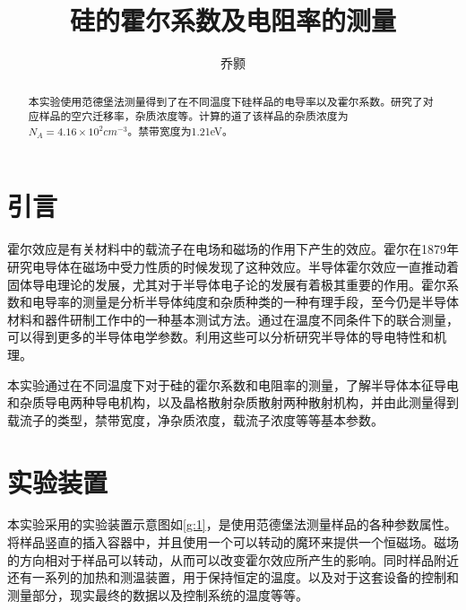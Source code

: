 \documentclass[aps,pre,12pt,preprint,onecolumn,showpacs,showkeys,UTF8]{revtex4-1}
\begin{document}
\title{\bf\heiti{}硅的霍尔系数及电阻率的测量\vspace{15mm}}
\author{\fangsong 乔颢\vspace{2mm}}
\begin{abstract}
	\vspace{10mm}
	\begin{spacing}{1.5}
		\songti{}本实验使用范德堡法测量得到了在不同温度下硅样品的电导率以及霍尔系数。研究了对应样品的空穴迁移率，杂质浓度等。计算的道了该样品的杂质浓度为$N_A=4.16\times10^2cm^{-3}$。禁带宽度为1.21eV。

	\end{spacing}
\end{abstract}

\maketitle

\section{引言}
霍尔效应是有关材料中的载流子在电场和磁场的作用下产生的效应。霍尔在1879年研究电导体在磁场中受力性质的时候发现了这种效应。半导体霍尔效应一直推动着固体导电理论的发展，尤其对于半导体电子论的发展有着极其重要的作用。霍尔系数和电导率的测量是分析半导体纯度和杂质种类的一种有理手段，至今仍是半导体材料和器件研制工作中的一种基本测试方法。通过在温度不同条件下的联合测量，可以得到更多的半导体电学参数。利用这些可以分析研究半导体的导电特性和机理。

本实验通过在不同温度下对于硅的霍尔系数和电阻率的测量，了解半导体本征导电和杂质导电两种导电机构，以及晶格散射杂质散射两种散射机构，并由此测量得到载流子的类型，禁带宽度，净杂质浓度，载流子浓度等等基本参数。


\section{实验装置}
本实验采用的实验装置示意图如\ref{g:1}，是使用范德堡法测量样品的各种参数属性。将样品竖直的插入容器中，并且使用一个可以转动的魔环来提供一个恒磁场。磁场的方向相对于样品可以转动，从而可以改变霍尔效应所产生的影响。同时样品附近还有一系列的加热和测温装置，用于保持恒定的温度。以及对于这套设备的控制和测量部分，现实最终的数据以及控制系统的温度等等。
\end{document}
